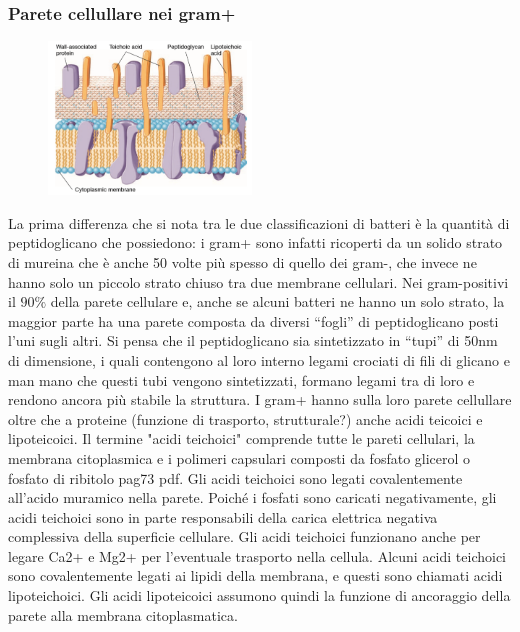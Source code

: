 \subsubsection{Parete cellullare nei gram+} 
\begin{figure}
  \begin{center}
    \includegraphics[width=0.48\textwidth]{Pictures/4.png}
  \end{center}
\end{figure}
La prima differenza che si nota tra le due classificazioni di batteri è la quantità di peptidoglicano che possiedono: i gram+ sono infatti ricoperti da un 
solido strato di mureina che è anche 50 volte più spesso di quello dei gram-, che invece ne hanno solo un piccolo strato chiuso tra due membrane cellulari.
Nei gram-positivi il $90\%$ della parete cellulare e, anche se alcuni batteri ne hanno un solo strato, la maggior parte ha una parete composta da diversi 
“fogli” di peptidoglicano posti l’uni sugli altri. Si pensa che il peptidoglicano sia sintetizzato in “tupi” di 50nm di dimensione, i quali contengono al 
loro interno legami crociati di fili di glicano e man mano che questi tubi vengono sintetizzati, formano legami tra di loro e rendono ancora più stabile la 
struttura. I gram+ hanno sulla loro parete cellullare oltre che a proteine (funzione di trasporto, strutturale?) anche acidi teicoici e lipoteicoici. Il 
termine "acidi teichoici" comprende tutte le pareti cellulari, la membrana citoplasmica e i polimeri capsulari composti da fosfato glicerol o fosfato di 
ribitolo pag73 pdf. Gli acidi teichoici sono legati covalentemente all’acido muramico nella parete. Poiché i fosfati sono caricati negativamente, gli acidi 
teichoici sono in parte responsabili della carica elettrica negativa complessiva della superficie cellulare. Gli acidi teichoici funzionano anche per legare 
Ca2+ e Mg2+ per l'eventuale trasporto nella cellula. Alcuni acidi teichoici sono covalentemente legati ai lipidi della membrana, e questi sono chiamati 
acidi lipoteichoici. Gli acidi lipoteicoici assumono quindi la funzione di ancoraggio della parete alla membrana citoplasmatica.
